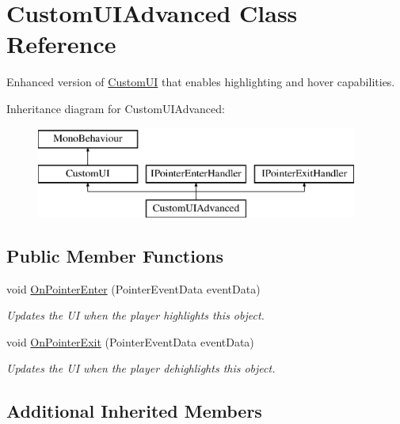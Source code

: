 \hypertarget{class_custom_u_i_advanced}{}\section{Custom\+U\+I\+Advanced Class Reference}
\label{class_custom_u_i_advanced}


Enhanced version of \hyperlink{class_custom_u_i}{Custom\+U\+I} that enables highlighting and hover capabilities.  


Inheritance diagram for Custom\+U\+I\+Advanced\+:\begin{figure}[H]
\begin{center}
\leavevmode
\includegraphics[height=3.000000cm]{class_custom_u_i_advanced}
\end{center}
\end{figure}
\subsection*{Public Member Functions}
\begin{DoxyCompactItemize}
\item 
void \hyperlink{class_custom_u_i_advanced_a989dc6bdcaf8a20d5536fc73c4922bc4}{On\+Pointer\+Enter} (Pointer\+Event\+Data event\+Data)
\begin{DoxyCompactList}\small\item\em Updates the U\+I when the player highlights this object. \end{DoxyCompactList}\item 
void \hyperlink{class_custom_u_i_advanced_a113412b5b4f6d2973458fe162f83790a}{On\+Pointer\+Exit} (Pointer\+Event\+Data event\+Data)
\begin{DoxyCompactList}\small\item\em Updates the U\+I when the player dehighlights this object. \end{DoxyCompactList}\end{DoxyCompactItemize}
\subsection*{Additional Inherited Members}


